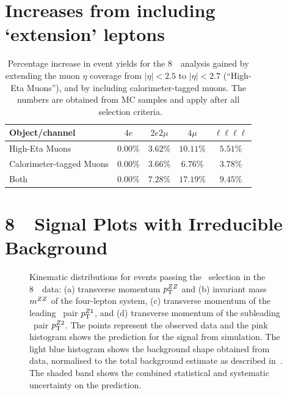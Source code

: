 \section{Increases from including `extension' leptons}

\begin{table}[htbp]
	 \centering
         \begin{tabular}{|l|ccc|c|}
         \hline\hline
         Object/channel & $4e$ & $2e2\mu$ &  $4\mu$ & $\ell\ell\ell\ell$\\\hline 
         High-Eta Muons               & $0.00$\% & $3.62$\% & $10.11$\% & $5.51$\% \\ 
         Calorimeter-tagged Muons     & $0.00$\% & $3.66$\% & $6.76$\% & $3.78$\% \\ 
         Both                         & $0.00$\% & $7.28$\% & $17.19$\% & $9.45$\% \\ 
         \hline\hline
	 \end{tabular}
	   \caption{Percentage increase in event yields for the 8~\tev\ analysis gained by extending the
           muon $\eta$ coverage from $|\eta|<2.5$ to  $|\eta|<2.7$ (``High-Eta Muons''), 
 and  by including calorimeter-tagged muons. The numbers are obtained from MC samples and apply after all \ZZ\ selection criteria. 
}
          \label{table:heta-muon-contribution}
\end{table}

\section{8~\tev\ Signal Plots with Irreducible Background}

\begin{figure}[htbp]
    \begin{center}
    \caption[Kinematic distributions for events passing the \ZZ\ selection in
    the 8~\tev\ data.]
    {Kinematic distributions for events passing the \ZZ\ selection in
    the 8~\tev\ data: (a) transverse momentum $p_{\mathrm{T}}^{ZZ}$ and (b) invariant mass $m^{ZZ}$ of the 
    four-lepton system, (c) transverse momentum of the leading
    \dilep\ pair $p_{\mathrm{T}}^{Z1}$, and (d) transverse momentum of the subleading
    \dilep\ pair $p_{\mathrm{T}}^{Z2}$. The points represent the observed data and the pink histogram
    shows the prediction for the signal from simulation. The light blue
    histogram shows the background shape obtained from data, normalised to the
    total background estimate as described in~. The shaded band 
    shows the combined statistical and systematic uncertainty on the prediction. 
    }
    \label{fig:zzdists-ZZ-eight}
    \end{center}
\end{figure}
